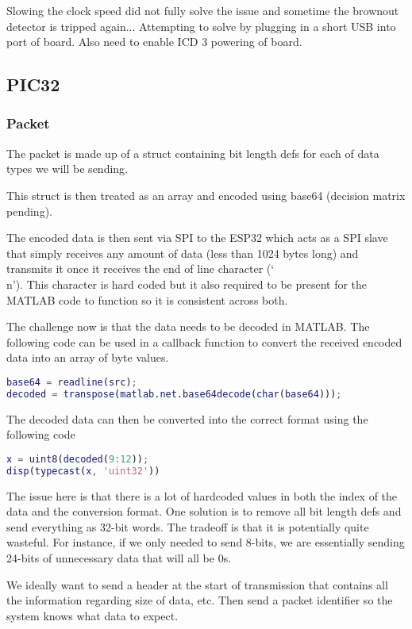 Slowing the clock speed did not fully solve the issue and sometime the brownout detector
is tripped again...
Attempting to solve by plugging in a short USB into port of board.
Also need to enable ICD 3 powering of board.

\subsection{PIC32}
\subsubsection{Packet}
The packet is made up of a struct containing bit length defs
for each of data types we will be sending.

This struct is then treated as an array and encoded using base64
(decision matrix pending).

The encoded data is then sent via SPI to the ESP32 which acts
as a SPI slave that simply receives any amount of data
(less than 1024 bytes long) and transmits it once it receives
the end of line character (`\\n').
This character is hard coded but it also required to be present
for the MATLAB code to function so it is consistent across both.

The challenge now is that the data needs to be decoded in MATLAB.
The following code can be used in a callback function to convert
the received encoded data into an array of byte values.

\begin{lstlisting}[language=MATLAB]
base64 = readline(src);
decoded = transpose(matlab.net.base64decode(char(base64)));
\end{lstlisting}

The decoded data can then be converted into the correct format
using the following code

\begin{lstlisting}[language=MATLAB]
x = uint8(decoded(9:12));
disp(typecast(x, 'uint32'))
\end{lstlisting}

The issue here is that there is a lot of hardcoded values
in both the index of the data and the conversion format.
One solution is to remove all bit length defs and send everything
as 32-bit words. The tradeoff is that it is potentially quite wasteful.
For instance, if we only needed to send 8-bits, we are essentially
sending 24-bits of unnecessary data that will all be 0s.

We ideally want to send a header at the start of transmission that
contains all the information regarding size of data, etc.
Then send a packet identifier so the system knows what data to expect.

